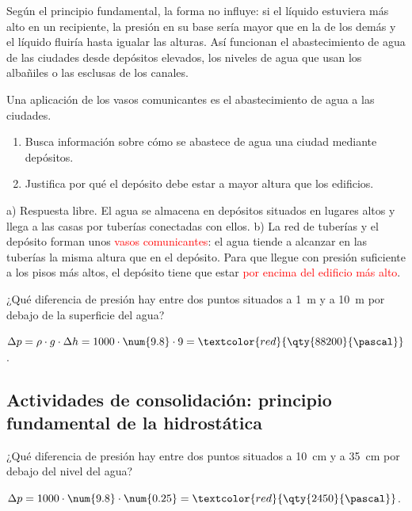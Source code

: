 Según el principio fundamental, la forma no influye: si el líquido estuviera más alto en un recipiente, la presión en su base sería mayor que en la de los demás y el líquido fluiría hasta igualar las alturas. Así funcionan el abastecimiento de agua de las ciudades desde depósitos elevados, los niveles de agua que usan los albañiles o las esclusas de los canales.

\begin{exercise}
    Una aplicación de los vasos comunicantes es el abastecimiento de agua a las ciudades.
    \begin{enumerate}[label=\alph*)]
        \item Busca información sobre cómo se abastece de agua una ciudad mediante depósitos.
        \item Justifica por qué el depósito debe estar a mayor altura que los edificios.
    \end{enumerate}
    \begin{solu}
        a) Respuesta libre. El agua se almacena en depósitos situados en lugares altos y llega a las casas por tuberías conectadas con ellos.
        b) La red de tuberías y el depósito forman unos \textcolor{red}{vasos comunicantes}: el agua tiende a alcanzar en las tuberías la misma altura que en el depósito. Para que llegue con presión suficiente a los pisos más altos, el depósito tiene que estar \textcolor{red}{por encima del edificio más alto}.
    \end{solu}
\end{exercise}

\begin{exercise}
    ¿Qué diferencia de presión hay entre dos puntos situados a \qty{1}{\m} y a \qty{10}{\m} por debajo de la superficie del agua?
    \begin{solu}
        \(\Delta p = \rho \cdot g \cdot \Delta h = 1000 \cdot \num{9.8} \cdot 9 = \textcolor{red}{\qty{88200}{\pascal}}\).
    \end{solu}
\end{exercise}

\subsection*{Actividades de consolidación: principio fundamental de la hidrostática}

\begin{exercise}
    ¿Qué diferencia de presión hay entre dos puntos situados a \qty{10}{\cm} y a \qty{35}{\cm} por debajo del nivel del agua?
    \begin{solu}
        \(\Delta p = 1000 \cdot \num{9.8} \cdot \num{0.25} = \textcolor{red}{\qty{2450}{\pascal}}\).
    \end{solu}
\end{exercise}


